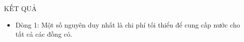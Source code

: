 KẾT QUẢ
\begin{itemize}
	\item     Dòng 1: Một số nguyên duy nhất là chi phí tối thiểu         để cung cấp nước cho tất cả các đồng cỏ.   
\end{itemize}